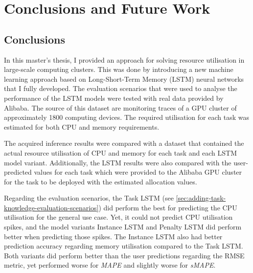 

\chapter{Conclusions and Future Work}
\label{ch:conclusions-and-future-work}


    \section{Conclusions}
    \label{sec:conclusions}


        In this master's thesis, I provided an approach for solving resource utilisation in large-scale computing clusters.
        This was done by introducing a new machine learning approach based on Long-Short-Term Memory (LSTM) neural networks that I fully developed.
        The evaluation scenarios that were used to analyse the performance of the LSTM models were tested with real data provided by Alibaba.
        The source of this dataset are monitoring traces of a GPU cluster of approximately 1800 computing devices.
        The required utilisation for each task was estimated for both CPU and memory requirements.

        The acquired inference results were compared with a dataset that contained the actual resource utilisation of CPU and memory for each task and each LSTM model variant. Additionally, the LSTM results were also compared with the user-predicted values for each task which were provided to the Alibaba GPU cluster for the task to be deployed with the estimated allocation values.

        Regarding the evaluation scenarios, the Task LSTM (see \ref{sec:adding-task-knowledge-evaluation-scenarios}) did perform the best for predicting the CPU utilisation for the general use case. Yet, it could not predict CPU utilisation spikes, and the model variants Instance LSTM and Penalty LSTM did perform better when predicting those spikes. The Instance LSTM also had better prediction accuracy regarding memory utilisation compared to the Task LSTM. Both variants did perform better than the user predictions regarding the RMSE metric, yet performed worse for \emph{MAPE} and slightly worse for \emph{sMAPE}.
        
